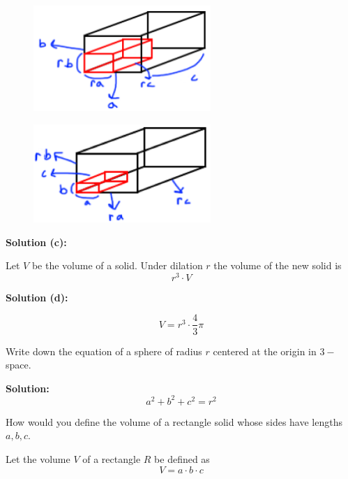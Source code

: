 \begin{figure}[h]
    \centering
    \includegraphics[width=0.6\textwidth]{images/arb1_rect.png}
\end{figure}

\begin{figure}[h]
    \centering
    \includegraphics[width=0.6\textwidth]{images/arb2_rect.png}
\end{figure}

\textbf{Solution (c):}

Let $V$ be the volume of a solid. Under dilation $r$ the volume of the 
new solid is 
\[r^3 \cdot V\]

\textbf{Solution (d):}

\[V = r^3 \cdot \frac{4}{3}\pi\]

\begin{tcolorbox}[title=Problem 9, breakable]
    Write down the equation of a sphere of radius $r$ centered at the 
    origin in $3-$space.
\end{tcolorbox}

\textbf{Solution:}
\[a^2 + b^2 + c^2 = r^2\]

\begin{tcolorbox}[title=Problem 10, breakable]
    How would you define the volume of a rectangle solid whose sides 
    have lengths $a, b, c$.
\end{tcolorbox}

\begin{definition}
    Let the volume $V$ of a rectangle $R$ be defined as
    \[V = a \cdot b \cdot c\]
\end{definition}

